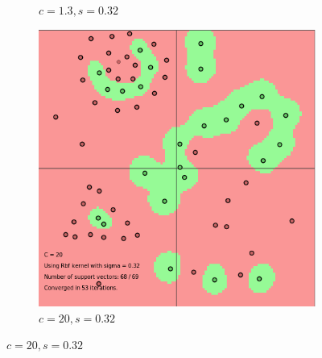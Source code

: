 \documentclass{article}
\begin{document}
\begin{figure}
\begin{subfigure}{0.3\textwidth}
   \caption{$c=1.3, s=0.32$} \label{fig:x_b}
\end{subfigure}
\hspace*{\fill}
\begin{subfigure}{0.3\textwidth}
   \includegraphics[width=\linewidth]{c=20_s=032}
   \caption{$c=20, s=0.32$} \label{fig:x_c}
\end{subfigure}


\end{figure}
\end{document}
